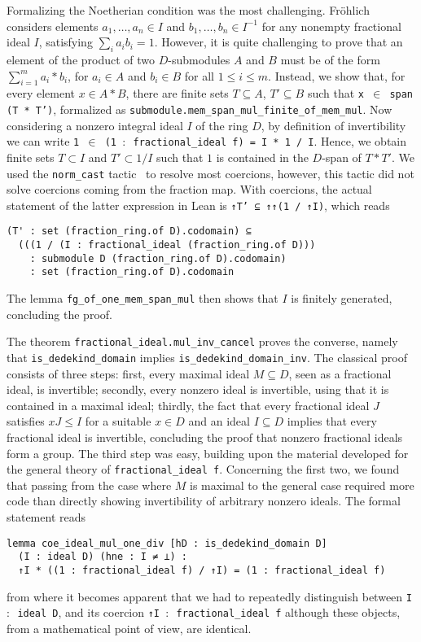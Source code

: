 \documentclass[a4paper,USenglish,cleveref, autoref, thm-restate]{lipics-v2021}
\newcommand{\lean}[1]{\texttt{#1}\xspace}
\begin{document}
Formalizing the Noetherian condition was the most challenging. Fr\"ohlich considers elements $a_1, \dots, a_n \in I$ and $b_1, \dots, b_n \in I^{-1}$ for any nonempty fractional ideal $I$,
satisfying $ \sum_i a_i b_i = 1 $.
However, it is quite challenging to prove that an element of the product of two $D$-submodules $A$ and $B$ must be of the form $\sum_{i = 1}^m a_i*b_i$, for $a_i \in A$ and $b_i \in B$ for all $1 \leq i \leq m$.
Instead, we show that, for every element $x\in A\ast B$, there are finite sets $T\subseteq A$, $T'\subseteq B$ such that \lean{x $\in$ span (T * T')}, formalized as
\lean{submodule.mem\_span\_mul\_finite\_of\_mem\_mul}.
Now considering a nonzero integral ideal $I$ of the ring $D$, by definition of invertibility we can write \lean{1 $\in$ (1 $:$ fractional\_ideal f) = I * 1 / I}. Hence, we obtain 
finite sets $T \subset I$ and $T' \subset 1/I$ such that $1$ is contained in the $D$-span of $T*T'$. We used the \lean{norm\_cast} tactic~\cite{norm_cast} to resolve most coercions, however, this tactic did not solve coercions coming from the fraction map. With coercions, the actual statement of the latter expression in Lean is \lean{↑T' ⊆ ↑↑(1 / ↑I)}, which reads
\begin{lstlisting}
(T' : set (fraction_ring.of D).codomain) ⊆
  (((1 / (I : fractional_ideal (fraction_ring.of D)))
    : submodule D (fraction_ring.of D).codomain)
    : set (fraction_ring.of D).codomain
\end{lstlisting}
The lemma \lean{fg\_of\_one\_mem\_span\_mul} then shows that $I$ is finitely generated, concluding the proof.

The theorem \lean{fractional\_ideal.mul\_inv\_cancel} proves the converse, namely that \lean{is\_dedekind\_domain} implies \lean{is\_dedekind\_domain\_inv}. The classical proof consists of three steps: first, every maximal ideal $M\subseteq D$, seen as a fractional ideal, is invertible;
secondly, every nonzero ideal is invertible, using that it is contained in a maximal ideal;
thirdly, the fact that every fractional ideal $J$ satisfies $xJ\leq I$ for a suitable $x\in D$ and an ideal $I\subseteq D$ implies that every fractional ideal is invertible, concluding the proof that nonzero fractional ideals form a group.
The third step was easy, building upon the material developed for the general theory of \lean{fractional\_ideal f}. Concerning the first two, we found that passing from the case where $M$ is maximal to the general case required more code than directly showing invertibility of arbitrary nonzero ideals. The formal statement reads
\begin{lstlisting}
lemma coe_ideal_mul_one_div [hD : is_dedekind_domain D] 
  (I : ideal D) (hne : I ≠ ⊥) :
  ↑I * ((1 : fractional_ideal f) / ↑I) = (1 : fractional_ideal f)
\end{lstlisting}
from where it becomes apparent that we had to repeatedly distinguish between \lean{I $:$ ideal D}, and its coercion \lean{↑I $:$ fractional\_ideal f} although these objects, from a mathematical point of view, are identical.
\end{document}
